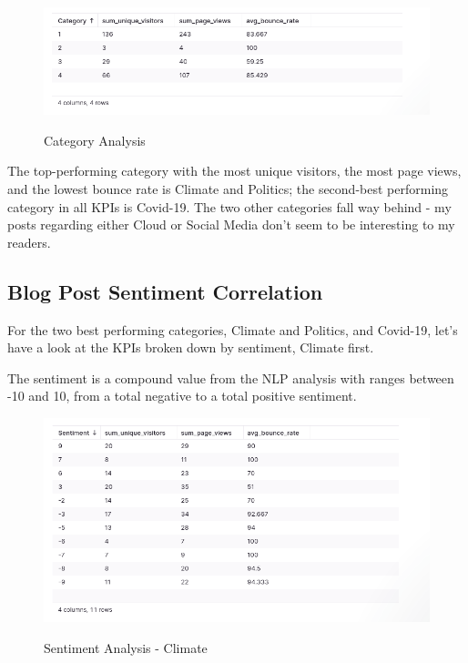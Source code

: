 \begin{figure}[H]
\centering
\caption {Category Analysis}
\includegraphics[width=\linewidth]{images/analysis-category.png}
\label{fig:analysisCategory}
\end{figure}

The top-performing category with the most unique visitors, the most page views, and the lowest bounce rate is Climate and Politics; the second-best performing category in all KPIs is Covid-19. The two other categories fall way behind - my posts regarding either Cloud or Social Media don't seem to be interesting to my readers.

\subsection{Blog Post Sentiment Correlation}

For the two best performing categories, Climate and Politics, and Covid-19, let's have a look at the KPIs broken down by sentiment, Climate first.

The sentiment is a compound value from the NLP analysis with ranges between -10 and 10, from a total negative to a total positive sentiment.

\begin{figure}[H]
\centering
\caption {Sentiment Analysis - Climate}
\includegraphics[width=\linewidth]{images/analysis-sentiment-climate.png}
\label{fig:sentimentClimate}
\end{figure}

